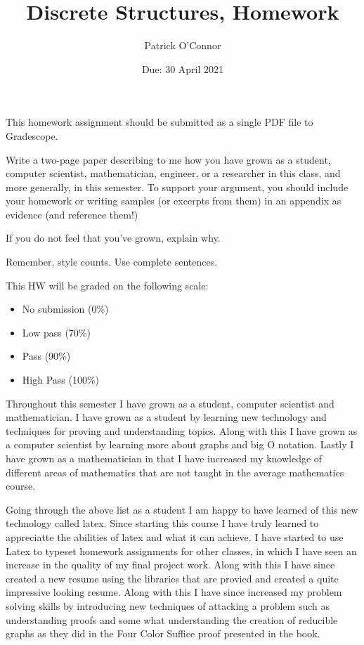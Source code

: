 \documentclass{article}
\title{Discrete Structures, Homework \hwnum}
\author{Patrick O'Connor}
\date{Due: 30 April 2021}
\begin{document}
\maketitle

This homework assignment should be
submitted as a single PDF file to Gradescope.

Write a two-page paper describing to me how you have grown as a student,
computer scientist, mathematician, engineer, or a researcher in this class, and
more generally, in this semester.  To support your argument, you should include
your homework or writing samples (or excerpts from them) in an appendix as
evidence (and reference them!)

If you do not feel that you've grown, explain why.

Remember, style counts. Use complete sentences.

This HW will be graded on the following scale:
\begin{itemize}
    \item No submission (0\%)
    \item Low pass (70\%)
    \item Pass (90\%)
    \item High Pass (100\%)
\end{itemize}

Throughout this semester I have grown as a student, computer scientist and mathematician. I have grown as 
a student by learning new technology and techniques for proving and understanding topics. Along with this 
I have grown as a computer scientist by learning more about graphs and big O notation. Lastly I have grown 
as a mathematician in that I have increased my knowledge of different areas of mathematics that are not taught 
in the average mathematics course. 

Going through the above list as a student I am happy to have learned of this new technology called latex. 
Since starting this course I have truly learned to appreciatte the abilities of latex and what it can achieve.
I have started to use Latex to typeset homework assignments for other classes, in which I have seen an increase 
in the quality of my final project work. Along with this I have since created a new resume using the libraries
that are provied and created a quite impressive looking resume. Along with this I have since increased my 
problem solving skills by introducing new techniques of attacking a problem such as understanding proofs 
and some what understanding the creation of reducible graphs as they did in the Four Color Suffice proof 
presented in the book.
\end{document}
